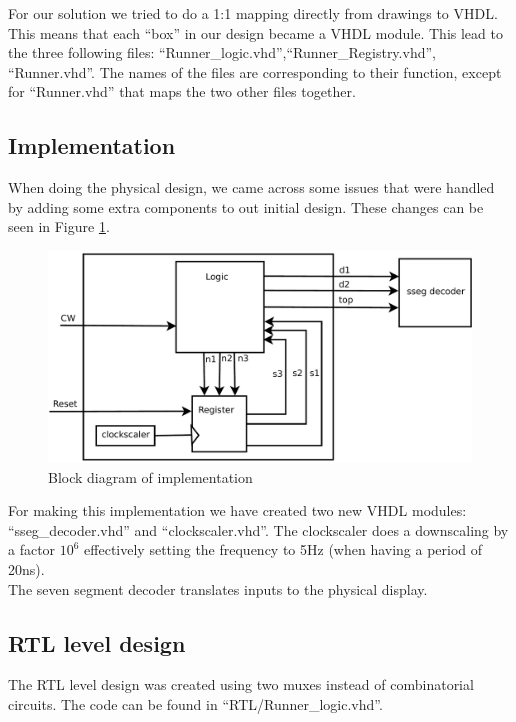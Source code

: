 For our solution we tried to do a 1:1 mapping directly from drawings to VHDL. This means that each ``box'' in our design
became a VHDL module. This lead to the three following files: ``Runner\_logic.vhd'',``Runner\_Registry.vhd'', ``Runner.vhd''.
The names of the files are corresponding to their function, except for ``Runner.vhd'' that maps the two other files together.\\
\subsection{Implementation}
When doing the physical design, we came across some issues that were handled by adding some extra components to out initial design. 
These changes can be seen in Figure \ref{fig:block_diagram_implementation}.
\begin{figure}[!htbp] 
	\centering 
        \includegraphics[height=0.4\textwidth]{fig/Block_diagram_implementation.pdf}
	\caption{Block diagram of implementation}
	\label{fig:block_diagram_implementation} 
\end{figure}
For making this implementation we have created two new VHDL modules: ``sseg\_decoder.vhd'' and ``clockscaler.vhd''. The clockscaler does a downscaling by a factor $10^{6}$ effectively setting the frequency to 5Hz (when having a period of 20ns).\\
The seven segment decoder translates inputs to the physical display.

\subsection{RTL level design}
The RTL level design was created using two muxes instead of combinatorial circuits. The code can be found in ``RTL/Runner\_logic.vhd''.